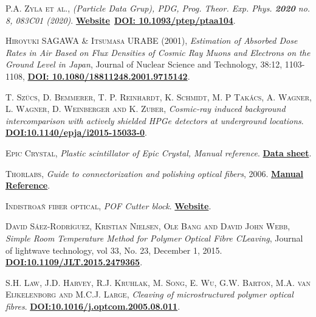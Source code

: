 \begin{thebibliography}{100}
 \textsc{P.A. Zyla et al.},
\textit{(Particle Data Grup), PDG, Prog. Theor. Exp. Phys. \textbf{2020} no. 8, 083C01 (2020)}. \href{https://pdg.lbl.gov/}{\textbf{Website}}~\href{https://academic.oup.com/ptep/article/2020/8/083C01/5891211}{\textbf{DOI: 10.1093/ptep/ptaa104}}.

 \textsc{Hiroyuki SAGAWA \& Itsumasa URABE (2001)},
\textit{Estimation of Absorbed Dose Rates in Air Based on Flux Densities of Cosmic Ray Muons and Electrons on the Ground Level in Japan}, Journal of Nuclear Science and Technology, 38:12, 1103-1108, \href{https://doi.org/10.1080/18811248.2001.9715142}{\textbf{DOI: 10.1080/18811248.2001.9715142}}.

 \textsc{T. Szücs, D. Bemmerer, T. P. Reinhardt, K. Schmidt, M. P Takács, A. Wagner, L. Wagner, D. Weinberger and K. Zuber},
\textit{Cosmic-ray induced background intercomparison with actively shielded HPGe detectors at underground locations}. \href{https://arxiv.org/abs/1503.00457v2}{\textbf{DOI:10.1140/epja/i2015-15033-0}}.

 \textsc{Epic Crystal},
\textit{Plastic scintillator of Epic Crystal, Manual reference}. \href{http://www.epic-crystal.com/others/plastic-scintillator.html}{\textbf{Data sheet}}.

 \textsc{Thorlabs},
\textit{Guide to connectorization and polishing optical fibers}, 2006. \href{https://www.thorlabs.de/thorproduct.cfm?partnumber=FN96A}{\textbf{Manual Reference}}.

 \textsc{Indistroañ fiber optical},
\textit{POF Cutter block}. \href{https://i-fiberoptics.com/tool-detail.php?id=105&cat=cutters}{\textbf{Website}}.

 \textsc{David Sáez-Rodríguez, Kristian Nielsen, Ole Bang and David John Webb},
\textit{Simple Room Temperature Method for Polymer Optical Fibre CLeaving}, Journal of lightwave technology, vol 33, No. 23, December 1, 2015. \href{https://ieeexplore.ieee.org/document/7274313}{\textbf{DOI:10.1109/JLT.2015.2479365}}.

 \textsc{S.H. Law, J.D. Harvey, R.J. Kruhlak, M. Song, E. Wu, G.W. Barton, M.A. van Eijkelenborg and M.C.J. Large},
\textit{Cleaving of microstructured polymer optical fibres}. \href{https://www.researchgate.net/publication/228880071_Cleaving_of_microstructured_polymer_optical_fibres}{\textbf{DOI:10.1016/j.optcom.2005.08.011}}.


\end{thebibliography}
